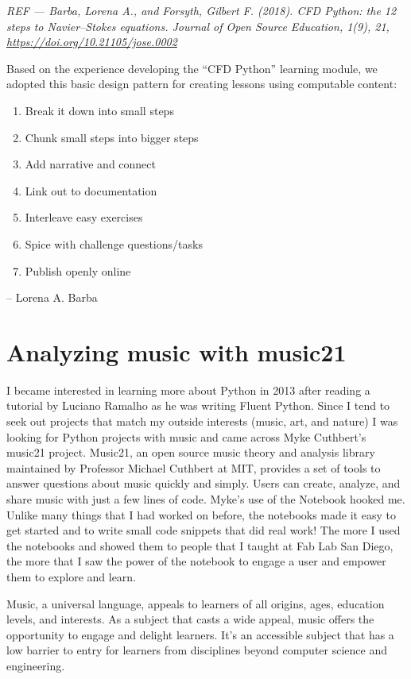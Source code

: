 \documentclass[]{book}
\providecommand{\tightlist}{%
  \setlength{\itemsep}{0pt}\setlength{\parskip}{0pt}}
\begin{document}
\emph{REF --- Barba, Lorena A., and Forsyth, Gilbert F. (2018). CFD
Python: the 12 steps to Navier--Stokes equations. Journal of Open Source
Education, 1(9), 21, \url{https://doi.org/10.21105/jose.0002} }

Based on the experience developing the ``CFD Python'' learning module,
we adopted this basic design pattern for creating lessons using
computable content:

\begin{enumerate}
\def\labelenumi{\arabic{enumi}.}
\tightlist
\item
  Break it down into small steps
\item
  Chunk small steps into bigger steps
\item
  Add narrative and connect
\item
  Link out to documentation
\item
  Interleave easy exercises
\item
  Spice with challenge questions/tasks
\item
  Publish openly online
\end{enumerate}

-- Lorena A. Barba

\section{Analyzing music with
music21}\label{analyzing-music-with-music21}

I became interested in learning more about Python in 2013 after reading
a tutorial by Luciano Ramalho as he was writing Fluent Python. Since I
tend to seek out projects that match my outside interests (music, art,
and nature) I was looking for Python projects with music and came across
Myke Cuthbert's music21 project. Music21, an open source music theory
and analysis library maintained by Professor Michael Cuthbert at MIT,
provides a set of tools to answer questions about music quickly and
simply. Users can create, analyze, and share music with just a few lines
of code. Myke's use of the Notebook hooked me. Unlike many things that I
had worked on before, the notebooks made it easy to get started and to
write small code snippets that did real work! The more I used the
notebooks and showed them to people that I taught at Fab Lab San Diego,
the more that I saw the power of the notebook to engage a user and
empower them to explore and learn.

Music, a universal language, appeals to learners of all origins, ages,
education levels, and interests. As a subject that casts a wide appeal,
music offers the opportunity to engage and delight learners. It's an
accessible subject that has a low barrier to entry for learners from
disciplines beyond computer science and engineering.
\end{document}
